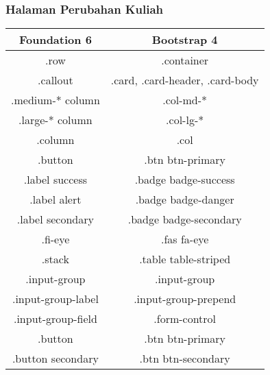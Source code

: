 \subsubsection{Halaman Perubahan Kuliah}
\begin{tabular}{|c|c|} 
	\hline
	\textbf{Foundation 6} & \textbf{Bootstrap 4}  \\ [0.5ex] 
	\hline\hline
	.row &   .container\\ 
	\hline	
	.callout &  .card, .card-header, .card-body \\
	\hline	
	.medium-* column &  .col-md-* \\
	\hline		
	.large-* column &  .col-lg-* \\
	\hline
	.column &  .col \\	
	\hline	
	.button &  .btn btn-primary\\
	\hline	
	.label success &  .badge badge-success \\
	\hline	
	.label alert & .badge badge-danger  \\
	\hline	
	.label secondary & .badge badge-secondary  \\
	\hline	
	.fi-eye &  .fas fa-eye \\	
	\hline		
	.stack & .table table-striped  \\
	\hline	
	.input-group & .input-group  \\ 
	\hline	
	.input-group-label & .input-group-prepend  \\ 
	\hline	
	.input-group-field& .form-control  \\ 
	\hline	
	.button & .btn btn-primary  \\ 
	\hline	
	.button secondary& .btn btn-secondary  \\[1ex] 
	\hline
\end{tabular}

